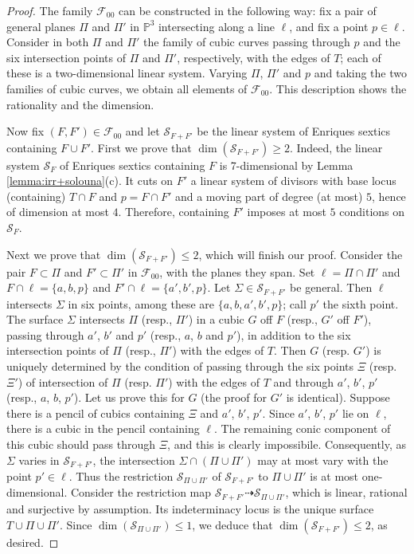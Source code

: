 \documentclass[11pt]{amsart}
\theoremstyle{definition}
\def\PP{{\mathbb P}}
\def\F{{\mathcal F}}
\begin{document}
\begin{proof}
  The family  $\F_{00}$ can be constructed in the following way: fix a pair of general planes $\Pi$ and $\Pi'$ in $\PP^3$ intersecting along a line $\ell$, and fix a point $p \in \ell$. Consider in both $\Pi$ and $\Pi'$ the family of cubic curves passing through $p$ and the six intersection points of $\Pi$ and $\Pi'$, respectively, with the edges of $T$; each of these is a two-dimensional linear system. Varying  $\Pi$, $\Pi'$ and $p$ and  taking the two families of cubic curves, we obtain all elements of $\F_{00}$. This description shows the rationality and the dimension. 
  
  Now fix $(F,F') \in \F_{00}$ and  let $\mathcal{S}_{F+F'}$ be the linear system of Enriques sextics containing $F \cup F'$. First we prove that $\dim (\mathcal{S}_{F+F'})\geqslant 2$.  Indeed,  the linear system $\mathcal{S}_F$ of Enriques sextics containing $F$ is 7-dimensional by Lemma \ref{lemma:irr+solouna}(c). It cuts on $F'$ a linear system of divisors with base locus (containing) $T \cap F$ and $p=F \cap F'$ and
a moving part of degree (at most) $5$, hence of dimension at most $4$. Therefore, containing $F'$ imposes at most $5$ conditions on $\mathcal{S}_F$. 

Next we prove that $\dim (\mathcal{S}_{F+F'})\leqslant 2$, which will finish our proof. Consider the pair $F \subset \Pi$ and $F' \subset  \Pi'$ in $\F_{00}$, with the planes they span. Set $\ell=\Pi\cap \Pi'$ and $F \cap \ell=\{a,b,p\}$ and $F' \cap \ell = \{a',b',p\}$. Let $\Sigma \in \mathcal{S}_{F+F'}$ be general. Then $\ell$ intersects $\Sigma$ in
six points, among these are $\{a,b,a',b',p\}$; call $p'$ the sixth point. The surface $\Sigma$ intersects $\Pi$ (resp., $\Pi'$) in a cubic $G$ off $F$ (resp., $G'$ off $F'$), passing through $a'$, $b'$ and $p'$ (resp., $a$, $b$ and $p'$), in addition to the 
six intersection points of $\Pi$ (resp., $\Pi'$) with the edges of $T$. \color{black} Then 
 $G$ (resp. $G'$) is uniquely determined by the condition of passing through the six points $\Xi$ (resp. $\Xi'$) of intersection of $\Pi$ (resp. $\Pi'$) with the edges of $T$ and through $a'$, $b'$, $p'$ (resp., $a$, $b$, $p'$). Let us prove this for $G$ (the proof for $G'$ is identical). Suppose there is a pencil of cubics containing $\Xi$ and $a'$, $b'$, $p'$. Since $a'$, $b'$, $p'$ lie on $\ell$, there is a cubic in the pencil containing $\ell$. The remaining conic component of this cubic should pass through $\Xi$, and this is clearly impossibile. \color{black} Consequently, \color{black} as $\Sigma$ varies in $\mathcal{S}_{F+F'}$, the intersection \color{black} $\Sigma \cap (\Pi \cup \Pi')$  may at most vary with the point $p' \in \ell$. Thus the restriction 
$\mathcal{S}_{\Pi \cup \Pi'}$ of 
$\mathcal{S}_{F+F'}$ to $\Pi \cup \Pi'$ is at most one-dimensional. Consider the restriction map $\mathcal{S}_{F+F'}\dasharrow \mathcal{S}_{\Pi \cup \Pi'}$, which is linear, rational and surjective by assumption. Its indeterminacy locus is the unique surface  $T \cup \Pi \cup \Pi'$. Since $\dim(\mathcal{S}_{\Pi \cup \Pi'})\leqslant 1$, we deduce that $\dim(\mathcal{S}_{F+F'})\leqslant 2$, as desired. \end{proof}
\end{document}
